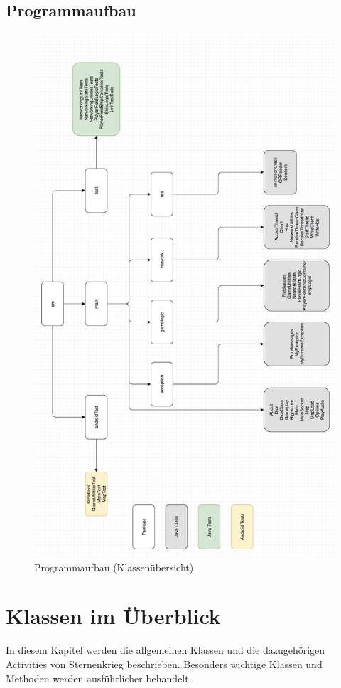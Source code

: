 \documentclass[11pt]{article} %
\begin{document}
\subsection{Programmaufbau}
\begin{figure}[H]
	\centering
 	\includegraphics[height=0.9\textheight]{img/package}
	\caption{Programmaufbau (Klassenübersicht)}
\end{figure}

\section{Klassen im Überblick}
In diesem Kapitel werden die allgemeinen Klassen und die dazugehörigen Activities von Sternenkrieg beschrieben. Besonders wichtige Klassen und Methoden werden ausführlicher behandelt.
\end{document}
